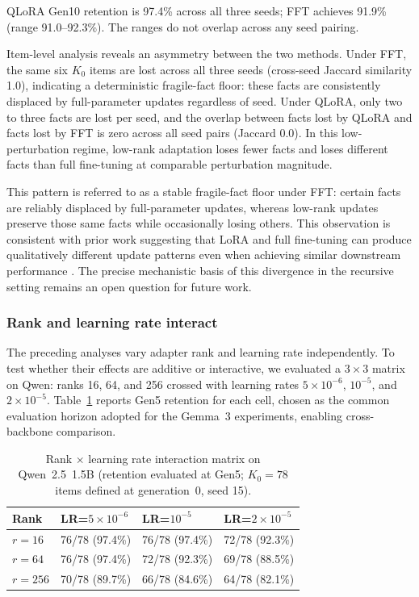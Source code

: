 \documentclass[a4paper,fleqn]{cas-dc}
\begin{document}
QLoRA Gen10 retention is 97.4\% across all three seeds; FFT achieves
91.9\% (range 91.0--92.3\%). The ranges do not overlap across any seed pairing.

Item-level analysis reveals an asymmetry between the two methods. Under FFT, the
same six $K_0$ items are lost across all three seeds (cross-seed Jaccard
similarity 1.0), indicating a deterministic fragile-fact floor: these facts are
consistently displaced by full-parameter updates regardless of seed. Under
QLoRA, only two to three facts are lost per seed, and the overlap between facts
lost by QLoRA and facts lost by FFT is zero across all seed pairs (Jaccard 0.0).
In this low-perturbation regime, low-rank adaptation loses fewer facts and loses
different facts than full fine-tuning at comparable perturbation magnitude.

This pattern is referred to as a stable fragile-fact floor under FFT: certain facts
are reliably displaced by full-parameter updates, whereas low-rank updates
preserve those same facts while occasionally losing others. This observation is
consistent with prior work suggesting that LoRA and full fine-tuning can produce
qualitatively different update patterns even when achieving similar downstream
performance \citep{shuttleworth2024illusion,biderman2024}. The precise
mechanistic basis of this divergence in the recursive setting remains an open
question for future work.

\subsubsection{Rank and learning rate interact}

The preceding analyses vary adapter rank and learning rate independently. To
test whether their effects are additive or interactive, we evaluated a
$3 \times 3$ matrix on Qwen: ranks 16, 64, and 256 crossed with learning rates
$5 \times 10^{-6}$, $10^{-5}$, and $2 \times 10^{-5}$. Table~\ref{tab:ranklr}
reports Gen5 retention for each cell, chosen as the common evaluation horizon
adopted for the Gemma~3 experiments, enabling cross-backbone comparison.

\begin{table}[width=.95\linewidth,cols=4,pos=htbp]
\caption{Rank $\times$ learning rate interaction matrix on Qwen~2.5~1.5B
(retention evaluated at Gen5; $K_0 = 78$ items defined at generation~0, seed 15).}\label{tab:ranklr}
\begin{tabular*}{\tblwidth}{@{} llll@{} }
\toprule
Rank & LR=$5{\times}10^{-6}$ & LR=$10^{-5}$ & LR=$2{\times}10^{-5}$ \\
\midrule
$r=16$  & 76/78 (97.4\%) & 76/78 (97.4\%) & 72/78 (92.3\%) \\
$r=64$  & 76/78 (97.4\%) & 72/78 (92.3\%) & 69/78 (88.5\%) \\
$r=256$ & 70/78 (89.7\%) & 66/78 (84.6\%) & 64/78 (82.1\%) \\
\bottomrule
\end{tabular*}
\end{table}
\end{document}
